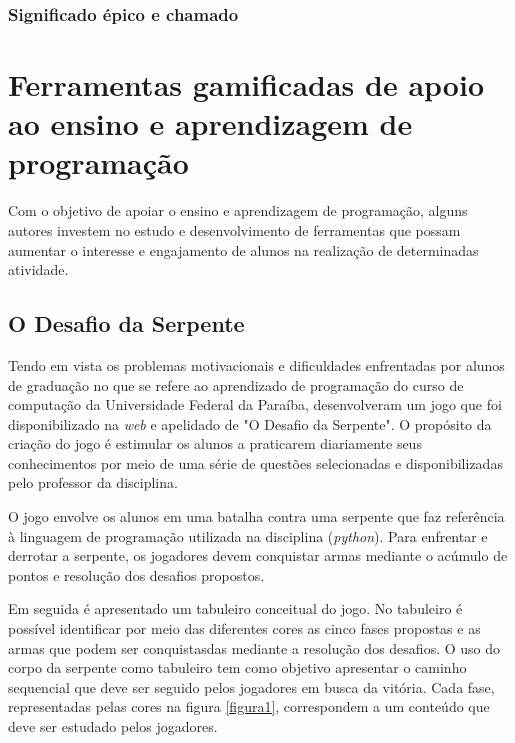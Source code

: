 \subsubsection{Significado épico e chamado}



\section{Ferramentas gamificadas de apoio ao ensino e aprendizagem de programação}
Com o objetivo de apoiar o ensino e aprendizagem de programação, alguns autores investem no estudo e desenvolvimento
de ferramentas que possam aumentar o interesse e engajamento de alunos na realização de determinadas atividade. 

\subsection{O Desafio da Serpente}
Tendo em vista os problemas motivacionais e dificuldades enfrentadas por alunos de graduação no que se refere ao
aprendizado de programação do curso de computação da Universidade Federal
da Paraíba,  desenvolveram um jogo que foi disponibilizado na \textit{web} {\itshape} e apelidado
de "O Desafio da Serpente". O propósito da criação do jogo é estimular os alunos a praticarem diariamente seus conhecimentos
por meio de uma série de questões selecionadas e disponibilizadas pelo professor da disciplina.

O jogo envolve os alunos em uma batalha contra uma serpente que faz referência à linguagem de programação utilizada na
disciplina (\textit{python}{\itshape}). Para enfrentar e derrotar a serpente, os jogadores devem conquistar armas mediante o acúmulo
de pontos e resolução dos desafios propostos. 

Em seguida é apresentado um tabuleiro conceitual do jogo. No tabuleiro é possível
identificar por meio das diferentes cores as cinco fases propostas e as armas que podem ser conquistasdas mediante a
resolução dos desafios. O uso do corpo da serpente como tabuleiro tem como objetivo apresentar o caminho sequencial que deve
ser seguido pelos jogadores em busca da vitória. Cada fase, representadas pelas cores na figura \ref{figura1}, correspondem a um conteúdo
que deve ser estudado pelos jogadores.


